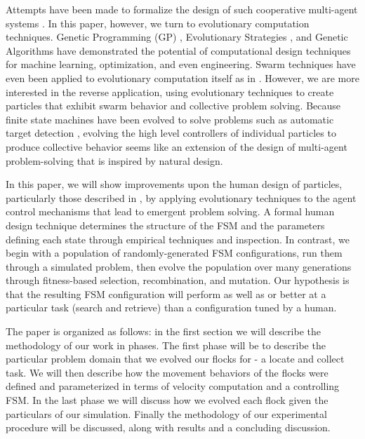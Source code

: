 \documentclass[conference,final]{IEEEtran}
\begin{document}
Attempts have been made to formalize the design of such cooperative multi-agent systems \cite{mataric1993designing,capera2003amas}. In this paper, however, we turn to evolutionary computation techniques. Genetic Programming (GP) \cite{koza1992genetic}, Evolutionary Strategies \cite{rechenberg1989evolution}, and Genetic Algorithms \cite{goldberg1988genetic} have demonstrated the potential of computational design techniques for machine learning, optimization, and even engineering. Swarm techniques have even been applied to evolutionary computation itself as in  \cite{wei2002swarm,miranda2005evolutionary}. However, we are more interested in the reverse application, using evolutionary techniques to create particles that exhibit swarm behavior and collective problem solving. Because finite state machines have been evolved to solve problems such as automatic target detection \cite{benson2000evolving}, evolving the high level controllers of individual particles to produce collective behavior seems like an extension of the design of multi-agent problem-solving that is inspired by natural design. 

In this paper, we will show improvements upon the human design of particles, particularly those described in \cite{rodriguez2004extending}, by applying evolutionary techniques to the agent control mechanisms that lead to emergent problem solving. A formal human design technique determines the structure of the FSM and the parameters defining each state through empirical techniques and inspection. In contrast, we begin with a population of randomly-generated FSM configurations, run them through a simulated problem, then evolve the population over many generations through fitness-based selection, recombination, and mutation. Our hypothesis is that the resulting FSM configuration will perform as well as or better at a particular task (search and retrieve) than a configuration tuned by a human.

The paper is organized as follows: in the first section we will describe the methodology of our work in phases. The first phase will be to describe the particular problem domain that we evolved our flocks for - a locate and collect task. We will then describe how the movement behaviors of the flocks were defined and parameterized in terms of velocity computation and a controlling FSM. In the last phase we will discuss how we evolved each flock given the particulars of our simulation. Finally the methodology of our experimental procedure will be discussed, along with results and a concluding discussion.
\end{document}
